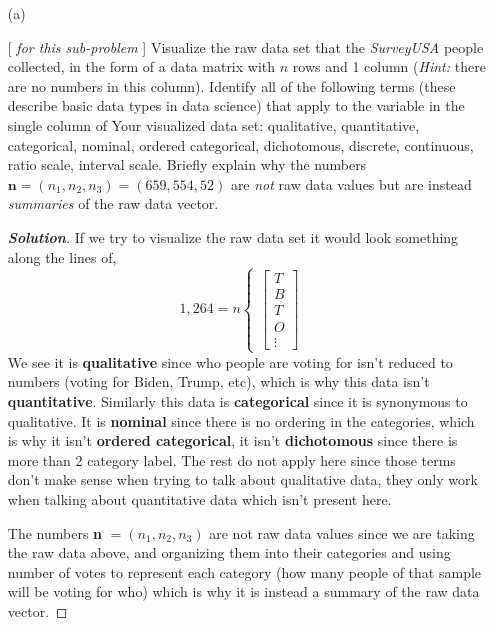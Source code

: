 \documentclass[12pt]{article}
\newenvironment{solution}{\begin{tcolorbox}[breakable]\begin{proof}[\textbf{\textit{Solution}}] }{\end{proof}\end{tcolorbox}}
\begin{document}
\newpage
\begin{itemize}
\item[(a)]

[ \textit{ \vspace*{0.025in} for this sub-problem} ] Visualize the raw data set that the \textit{SurveyUSA} people collected, in the form of a data matrix with $n$ rows and 1 column (\textit{Hint:} there are no numbers in this column). Identify all of the following terms (these describe basic data types in data science) that apply to the variable in the single column of Your visualized data set: qualitative, quantitative, categorical, nominal, ordered categorical, dichotomous, discrete, continuous, ratio scale, interval scale. Briefly explain why the numbers $\bm{ n } = ( n_1, n_2, n_3 ) = ( 659, 554, 52 )$ are \textit{not} raw data values but are instead \textit{summaries} of the raw data vector. \textit{}

\begin{solution}
    If we try to visualize the raw data set it would look something along the lines of,
    \[1,264 = n\begin{cases}\begin{bmatrix}
        T \\ B \\ T \\ O \\ \vdots
    \end{bmatrix} & \end{cases}\]
    We see it is \textbf{qualitative} since who people are voting for isn't reduced to numbers (voting for Biden, Trump, etc), which is why this data isn't \textbf{quantitative}. Similarly this data is \textbf{categorical} since it is synonymous to qualitative. It is \textbf{nominal} since there is no ordering in the categories, which is why it isn't \textbf{ordered categorical}, it isn't \textbf{dichotomous} since there is more than 2 category label. The rest do not apply here since those terms don't make sense when trying to talk about qualitative data, they only work when talking about quantitative data which isn't present here. 

    The numbers \textbf{n} $ = (n_1, n_2, n_3)$ are not raw data values since we are taking the raw data above, and organizing them into their categories and using number of votes to represent each category (how many people of that sample will be voting for who) which is why it is instead a summary of the raw data vector. 
\end{solution}


\end{itemize}
\end{document}
